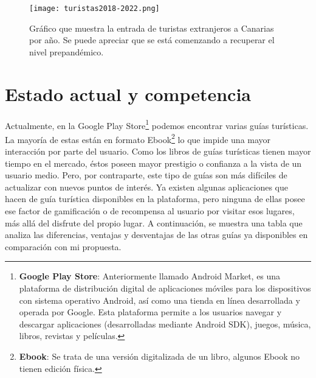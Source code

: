 \documentclass{report}
\begin{document}
\begin{figure}[H]
    \centering
    \texttt{[image: turistas2018-2022.png]}
    \caption{Gráfico que muestra la entrada de turistas extranjeros a Canarias por año. Se puede apreciar que se está comenzando a recuperar el nivel prepandémico.}
    \label{fig:mapaNoCompleto}
\end{figure}

\section{Estado actual y competencia}
Actualmente, en la Google Play Store\footnote{\textbf{Google Play Store}:  Anteriormente llamado Android Market, es una plataforma de distribución digital de aplicaciones móviles para los dispositivos con sistema operativo Android, así como una tienda en línea desarrollada y operada por Google. Esta plataforma permite a los usuarios navegar y descargar aplicaciones (desarrolladas mediante Android SDK), juegos, música, libros, revistas y películas.} podemos encontrar varias guías turísticas. 
La mayoría de estas están en formato Ebook\footnote{\textbf{Ebook}: Se trata de una versión digitalizada de un libro, algunos Ebook no tienen edición física.} lo que impide una mayor interacción por parte del usuario. Como los libros de guías turísticas tienen mayor tiempo en el mercado, éstos poseen mayor prestigio o confianza a la vista de un usuario medio. Pero, por contraparte, este tipo de guías son más difíciles de actualizar con nuevos puntos de interés.
Ya existen algunas aplicaciones que hacen de guía turística disponibles en la plataforma, pero ninguna de ellas posee ese factor de gamificación o de recompensa al usuario por visitar esos lugares, más allá del disfrute del propio lugar. A continuación, se muestra una tabla que analiza las diferencias, ventajas y desventajas de las otras guías ya disponibles en comparación con mi propuesta.
\end{document}

